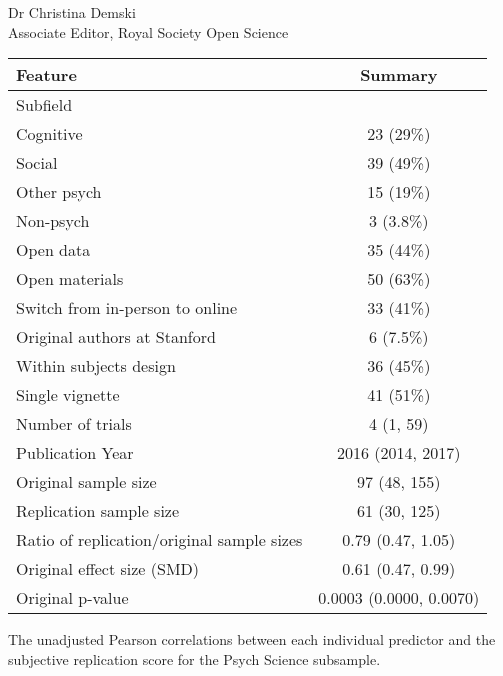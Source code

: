 \documentclass{stanfordletter}
\begin{document}
\begin{letter}{Dr Christina Demski \\ Associate Editor, Royal Society Open Science}
\begin{center}
          \fontsize{10}{12}\selectfont
          \begin{tabular}[t]{lc}
          	\toprule
          	Feature & Summary\\
          	\midrule
          	Subfield & \\
          	\hspace{1em}Cognitive & 23 (29\%)\\
          	\hspace{1em}Social & 39 (49\%)\\
          	\hspace{1em}Other psych & 15 (19\%)\\
          	\hspace{1em}Non-psych & 3 (3.8\%)\\
          	Open data & 35 (44\%)\\
          	Open materials & 50 (63\%)\\
          	Switch from in-person to online & 33 (41\%)\\
          	Original authors at Stanford & 6 (7.5\%)\\
          	Within subjects design & 36 (45\%)\\
          	Single vignette & 41 (51\%)\\
          	Number of trials & 4 (1, 59)\\
          	Publication Year & 2016 (2014, 2017)\\
          	Original sample size & 97 (48, 155)\\
          	Replication sample size & 61 (30, 125)\\
          	Ratio of replication/original sample sizes & 0.79 (0.47, 1.05)\\
          	Original effect size (SMD) & 0.61 (0.47, 0.99)\\
          	Original p-value & 0.0003 (0.0000, 0.0070)\\
          	\bottomrule
          \end{tabular}

          

          
     The unadjusted Pearson correlations between each individual predictor and the subjective replication score for the Psych Science subsample.


\end{center}
\end{letter}
\end{document}
